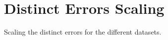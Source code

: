 
\newpage
\chapter{Distinct Errors Scaling}
\label{apendix:distinct_errors_scaling}

Scaling the distinct errors for the different datasets.

